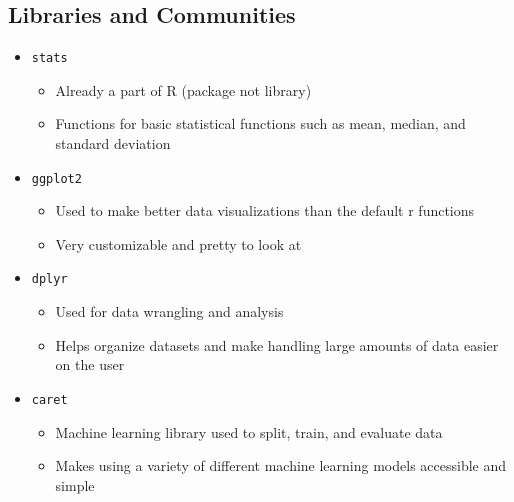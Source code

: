 \subsection{Libraries and Communities \cite{microsoft_what_2015}}
\begin{itemize}
	\item \texttt{stats}
	\begin{itemize}
		\item Already a part of R (package not library)
		\item Functions for basic statistical functions such as mean, median, and standard deviation
	\end{itemize}

	\item \texttt{ggplot2}
	\begin{itemize}
		\item Used to make better data visualizations than the default r functions
		\item Very customizable and pretty to look at
	\end{itemize}

	\item \texttt{dplyr}
	\begin{itemize}
		\item Used for data wrangling and analysis
		\item Helps organize datasets and make handling large amounts of data easier on the user
	\end{itemize}

	\item \texttt{caret}
	\begin{itemize}
		\item Machine learning library used to split, train, and evaluate data
		\item Makes using a variety of different machine learning models accessible and simple
	\end{itemize}
\end{itemize}
